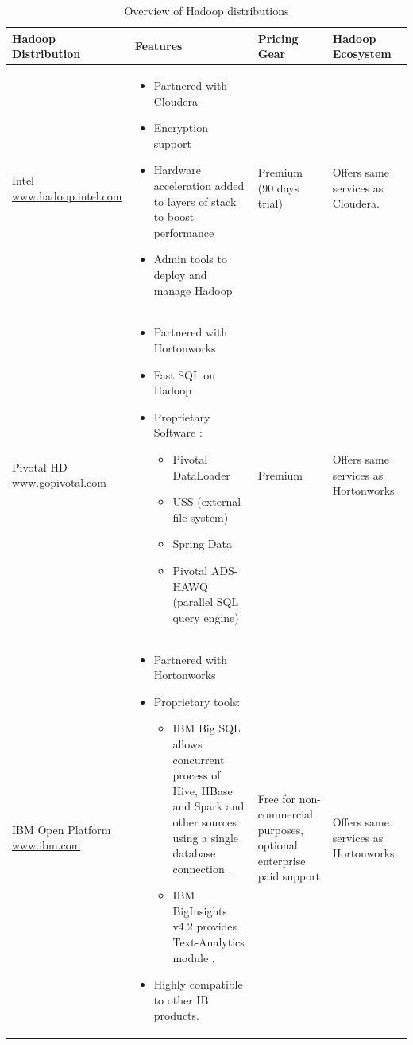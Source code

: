 \documentclass[12pt]{article}
\begin{document}
\begin{table}[H]
\hspace{-3.3cm}
\begin{tabular}{|p{4.4cm}|p{6.2cm}|p{4cm}|p{4cm}|}
	\hline
	\textbf{Hadoop \newline Distribution} & \textbf{Features} & \textbf{ Pricing Gear}  & \textbf{ Hadoop \newline Ecosystem}\\ \hline
Intel
\href{https://http://hadoop.intel.com/}{www.hadoop.intel.com}
&\begin{itemize}[noitemsep,leftmargin=*] 
\item Partnered with Cloudera \citep{MervAdrian2017}
\item Encryption support
\item Hardware acceleration added to layers of stack to boost performance
\item Admin tools to deploy and manage Hadoop
\end{itemize}&
Premium (90 days trial) & Offers same
services as
Cloudera. \\ \hline
Pivotal HD
 \href{https://gopivotal.com//} {www.gopivotal.com} &\begin{itemize}[noitemsep,leftmargin=*] 
\item Partnered with Hortonworks \citep{MervAdrian2017}
\item Fast SQL on Hadoop
\item Proprietary Software \citep{Pivotal2018}:
\begin{itemize}
\item Pivotal DataLoader
\item USS (external file system)
\item Spring Data
\item Pivotal ADS-HAWQ (parallel SQL query engine)
\end{itemize}
\end{itemize}& Premium &Offers same services as Hortonworks.\\ \hline
IBM Open Platform
\href{https://www.ibm.com/de-de/?ar=1}{www.ibm.com}&\begin{itemize}[noitemsep,leftmargin=*] 
\item Partnered with Hortonworks \citep{MervAdrian2017}
\item Proprietary tools:
\begin{itemize}
\item IBM Big SQL allows concurrent process of Hive, HBase and Spark and other sources using a single database connection \citep{MervAdrian2017}.
\item IBM BigInsights v4.2 provides Text-Analytics module \citep{I.K.Center2018}.
\end{itemize}
\item Highly compatible to other IB products.
\end{itemize}
&Free for non-commercial purposes, optional enterprise paid support \citep{IBMAnalytics2018}
& Offers same services as Hortonworks.\\ \hline
\end{tabular}
\caption{Overview of Hadoop distributions}
\label{tab:distributions}
\end{table}
\end{document}
